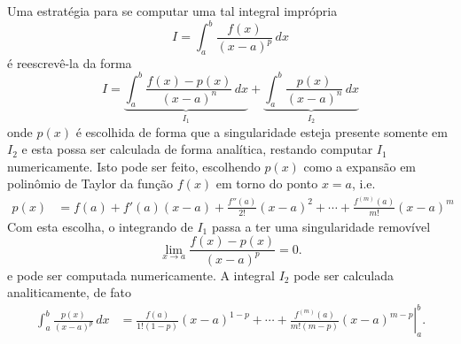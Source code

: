 Uma estratégia para se computar uma tal integral imprópria
\begin{equation}
  I = \int_a^b\frac{f(x)}{(x-a)^p}\,dx
\end{equation}
é reescrevê-la da forma
\begin{equation}
  I = \underbrace{\int_a^b\frac{f(x)-p(x)}{(x-a)^n}\,dx}_{I_1} + \underbrace{\int_a^b \frac{p(x)}{(x-a)^n}\,dx}_{I_2}
\end{equation}
onde $p(x)$ é escolhida de forma que a singularidade esteja presente somente em $I_2$ e esta possa ser calculada de forma analítica, restando computar $I_1$ numericamente. Isto pode ser feito, escolhendo $p(x)$ como a expansão em polinômio de Taylor da função $f(x)$ em torno do ponto $x=a$, i.e.
\begin{equation}
  \begin{split}
    p(x) &= f(a) + f'(a)(x-a) + \frac{f''(a)}{2!}(x-a)^2 + \cdots + \frac{f^{(m)}(a)}{m!}(x-a)^m
  \end{split}
\end{equation}
Com esta escolha, o integrando de $I_1$ passa a ter uma singularidade removível
\begin{equation}
  \lim_{x\to a}\frac{f(x)-p(x)}{(x-a)^p} = 0.
\end{equation}
e pode ser computada numericamente. A integral $I_2$ pode ser calculada analiticamente, de fato
\begin{equation}
  \begin{split}
    \int_a^b \frac{p(x)}{(x-a)^p}\,dx &= \left.\frac{f(a)}{1!(1-p)}(x-a)^{1-p} + \cdots + \frac{f^{(m)}(a)}{m!(m-p)}(x-a)^{m-p}\right|_{a}^b.
  \end{split}
\end{equation}

